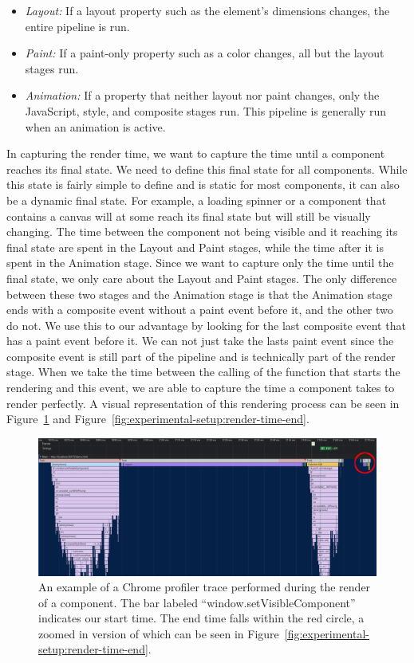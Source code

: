 \begin{itemize}
  \item \emph{Layout:} If a layout property such as the element's dimensions changes, the entire pipeline is run.
  \item \emph{Paint:} If a paint-only property such as a color changes, all but the layout stages run.
  \item \emph{Animation:} If a property that neither layout nor paint changes, only the JavaScript, style, and composite stages run. This pipeline is generally run when an animation is active.
\end{itemize}

In capturing the render time, we want to capture the time until a component reaches its final state. We need to define this final state for all components. While this state is fairly simple to define and is static for most components, it can also be a dynamic final state. For example, a loading spinner or a component that contains a canvas will at some reach its final state but will still be visually changing. The time between the component not being visible and it reaching its final state are spent in the Layout and Paint stages, while the time after it is spent in the Animation stage. Since we want to capture only the time until the final state, we only care about the Layout and Paint stages. The only difference between these two stages and the Animation stage is that the Animation stage ends with a composite event without a paint event before it, and the other two do not. We use this to our advantage by looking for the last composite event that has a paint event before it. We can not just take the lasts paint event since the composite event is still part of the pipeline and is technically part of the render stage. When we take the time between the calling of the function that starts the rendering and this event, we are able to capture the time a component takes to render perfectly. A visual representation of this rendering process can be seen in Figure~\ref{fig:experimental-setup:render-time-start} and Figure~\ref{fig:experimental-setup:render-time-end}.

\begin{figure}[h]
  \includegraphics[width=\columnwidth]{figures/experimental-setup/render-time-highlighted.png}
  \caption{An example of a Chrome profiler trace performed during the render of a component. The bar labeled ``window.setVisibleComponent'' indicates our start time. The end time falls within the red circle, a zoomed in version of which can be seen in Figure~\ref{fig:experimental-setup:render-time-end}.}
  \label{fig:experimental-setup:render-time-start}
  \centering
\end{figure}

